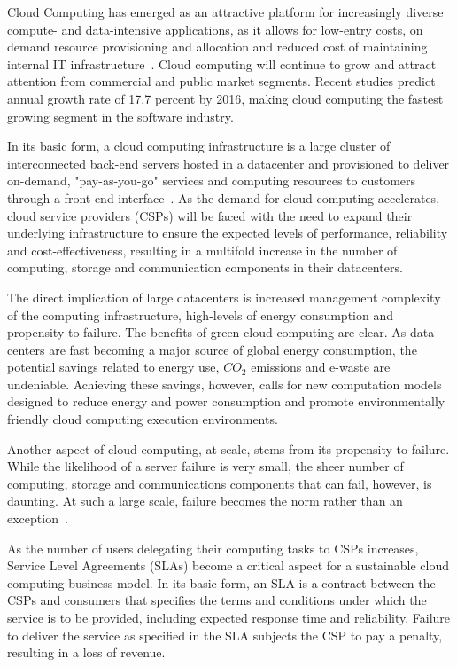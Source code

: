 \noindent 

Cloud Computing has emerged as an attractive platform for increasingly
diverse compute- and data-intensive applications, as it allows for
low-entry costs, on demand resource provisioning and allocation and
reduced cost of maintaining internal IT
infrastructure~\cite{tchana_cits_2012}. Cloud computing will continue
to grow and attract attention from commercial and public market
segments. Recent studies predict annual growth rate of 17.7 percent by
2016, making cloud computing the fastest growing segment in the
software industry.



In its basic form, a cloud computing infrastructure is a large cluster
of interconnected back-end servers hosted in a datacenter and
provisioned to deliver on-demand, "pay-as-you-go" services and
computing resources to customers through a front-end
interface~\cite{ec2_site}. As the demand for cloud computing
accelerates, cloud service providers (CSPs) will be faced with the
need to expand their underlying infrastructure to ensure the expected
levels of performance, reliability and cost-effectiveness, resulting
in a multifold increase in the number of computing, storage and
communication components in their datacenters. 

The direct implication of large datacenters is increased management complexity 
of the computing infrastructure, high-levels of energy consumption and propensity to
failure. The benefits of green cloud computing are clear.  As data centers are fast becoming a major source of global energy consumption,
the potential savings related to energy use, $CO_2$ emissions and e-waste are undeniable. Achieving these savings, however, calls for new computation models 
designed to reduce energy and power consumption and promote environmentally friendly cloud computing execution environments.

Another aspect of cloud computing, at scale, stems from its propensity to failure. 
While the likelihood of a server failure is very small, the
sheer number of computing, storage and communications components that
can fail, however, is daunting. At such a large scale, failure becomes
the norm rather than an exception~\cite{schroeder_2010_dsc}.

As the number of users delegating their computing tasks to CSPs
increases, Service Level Agreements (SLAs) become a critical aspect
for a sustainable cloud computing business model. In its basic form,
an SLA is a contract between the CSPs and consumers that specifies the
terms and conditions under which the service is to be provided,
including expected response time and reliability. Failure to deliver
the service as specified in the SLA subjects the CSP to pay a penalty,
resulting in a loss of revenue.

